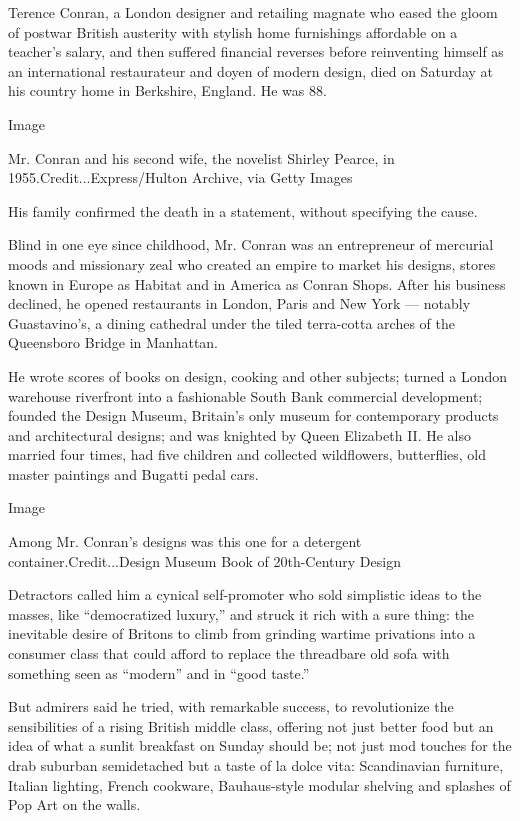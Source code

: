 Terence Conran, a London designer and retailing magnate who eased the
gloom of postwar British austerity with stylish home furnishings
affordable on a teacher's salary, and then suffered financial reverses
before reinventing himself as an international restaurateur and doyen of
modern design, died on Saturday at his country home in Berkshire,
England. He was 88.

Image

Mr. Conran and his second wife, the novelist Shirley Pearce, in
1955.Credit...Express/Hulton Archive, via Getty Images

His family confirmed the death in a statement, without specifying the
cause.

Blind in one eye since childhood, Mr. Conran was an entrepreneur of
mercurial moods and missionary zeal who created an empire to market his
designs, stores known in Europe as Habitat and in America as Conran
Shops. After his business declined, he opened restaurants in London,
Paris and New York --- notably Guastavino's, a dining cathedral under
the tiled terra-cotta arches of the Queensboro Bridge in Manhattan.

He wrote scores of books on design, cooking and other subjects; turned a
London warehouse riverfront into a fashionable South Bank commercial
development; founded the Design Museum, Britain's only museum for
contemporary products and architectural designs; and was knighted by
Queen Elizabeth II. He also married four times, had five children and
collected wildflowers, butterflies, old master paintings and Bugatti
pedal cars.

Image

Among Mr. Conran's designs was this one for a detergent
container.Credit...Design Museum Book of 20th-Century Design

Detractors called him a cynical self-promoter who sold simplistic ideas
to the masses, like ``democratized luxury,'' and struck it rich with a
sure thing: the inevitable desire of Britons to climb from grinding
wartime privations into a consumer class that could afford to replace
the threadbare old sofa with something seen as ``modern'' and in ``good
taste.''

But admirers said he tried, with remarkable success, to revolutionize
the sensibilities of a rising British middle class, offering not just
better food but an idea of what a sunlit breakfast on Sunday should be;
not just mod touches for the drab suburban semidetached but a taste of
la dolce vita: Scandinavian furniture, Italian lighting, French
cookware, Bauhaus-style modular shelving and splashes of Pop Art on the
walls.

